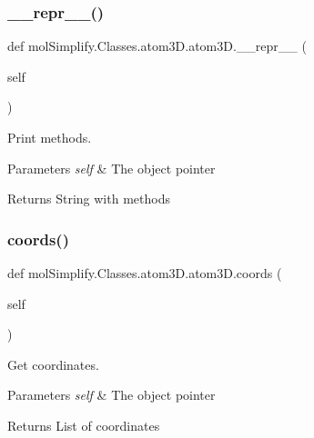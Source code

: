 \subsubsection{\texorpdfstring{\+\_\+\+\_\+repr\+\_\+\+\_\+()}{\_\_repr\_\_()}}
{\footnotesize\ttfamily def mol\+Simplify.\+Classes.\+atom3\+D.\+atom3\+D.\+\_\+\+\_\+repr\+\_\+\+\_\+ (\begin{DoxyParamCaption}\item[{}]{self }\end{DoxyParamCaption})}



Print methods. 


\begin{DoxyParams}{Parameters}
{\em self} & The object pointer \\
\hline
\end{DoxyParams}
\begin{DoxyReturn}{Returns}
String with methods 
\end{DoxyReturn}
\mbox{\label{classmolSimplify_1_1Classes_1_1atom3D_1_1atom3D_a0bb2c02700429e2e3c5c4371ee75f1ec}} 
\subsubsection{\texorpdfstring{coords()}{coords()}}
{\footnotesize\ttfamily def mol\+Simplify.\+Classes.\+atom3\+D.\+atom3\+D.\+coords (\begin{DoxyParamCaption}\item[{}]{self }\end{DoxyParamCaption})}



Get coordinates. 


\begin{DoxyParams}{Parameters}
{\em self} & The object pointer \\
\hline
\end{DoxyParams}
\begin{DoxyReturn}{Returns}
List of coordinates 
\end{DoxyReturn}
\mbox{\label{classmolSimplify_1_1Classes_1_1atom3D_1_1atom3D_a0d5567e58ee8b779ba24bb53a596ef0d}} 
